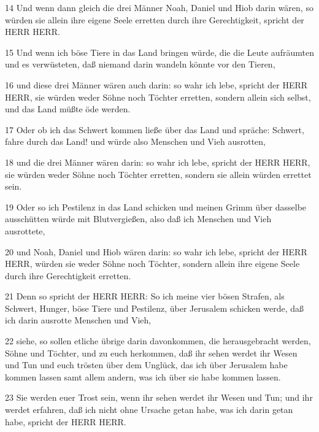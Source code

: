 \par 14 Und wenn dann gleich die drei Männer Noah, Daniel und Hiob darin wären, so würden sie allein ihre eigene Seele erretten durch ihre Gerechtigkeit, spricht der HERR HERR.
\par 15 Und wenn ich böse Tiere in das Land bringen würde, die die Leute aufräumten und es verwüsteten, daß niemand darin wandeln könnte vor den Tieren,
\par 16 und diese drei Männer wären auch darin: so wahr ich lebe, spricht der HERR HERR, sie würden weder Söhne noch Töchter erretten, sondern allein sich selbst, und das Land müßte öde werden.
\par 17 Oder ob ich das Schwert kommen ließe über das Land und spräche: Schwert, fahre durch das Land! und würde also Menschen und Vieh ausrotten,
\par 18 und die drei Männer wären darin: so wahr ich lebe, spricht der HERR HERR, sie würden weder Söhne noch Töchter erretten, sondern sie allein würden errettet sein.
\par 19 Oder so ich Pestilenz in das Land schicken und meinen Grimm über dasselbe ausschütten würde mit Blutvergießen, also daß ich Menschen und Vieh ausrottete,
\par 20 und Noah, Daniel und Hiob wären darin: so wahr ich lebe, spricht der HERR HERR, würden sie weder Söhne noch Töchter, sondern allein ihre eigene Seele durch ihre Gerechtigkeit erretten.
\par 21 Denn so spricht der HERR HERR: So ich meine vier bösen Strafen, als Schwert, Hunger, böse Tiere und Pestilenz, über Jerusalem schicken werde, daß ich darin ausrotte Menschen und Vieh,
\par 22 siehe, so sollen etliche übrige darin davonkommen, die herausgebracht werden, Söhne und Töchter, und zu euch herkommen, daß ihr sehen werdet ihr Wesen und Tun und euch trösten über dem Unglück, das ich über Jerusalem habe kommen lassen samt allem andern, was ich über sie habe kommen lassen.
\par 23 Sie werden euer Trost sein, wenn ihr sehen werdet ihr Wesen und Tun; und ihr werdet erfahren, daß ich nicht ohne Ursache getan habe, was ich darin getan habe, spricht der HERR HERR.

\chapter{15}

